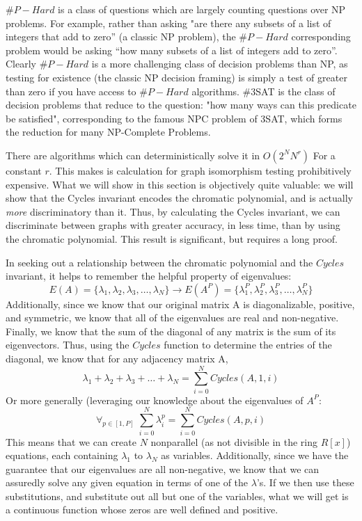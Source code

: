 $\#P-Hard$ is a class of questions which are largely counting questions over NP problems.
For example, rather than asking "are there any subsets of a list of integers that add to zero'' (a classic NP problem),
the $\#P-Hard$ corresponding problem would be asking ``how many subsets of a list of integers add to zero''.
Clearly $\#P-Hard$ is a more challenging class of decision problems than NP, as testing for existence (the classic NP decision framing) is simply a test of greater than zero if you have access to $\#P-Hard$ algorithms.
\#3SAT is the class of decision problems that reduce to the question: "how many ways can this predicate be satisfied", corresponding to the famous NPC problem of 3SAT, which forms the reduction for many NP-Complete Problems.

There are algorithms which can deterministically solve it in $O(2^N N^r)$ For a constant $r$.
This makes is calculation for graph isomorphism testing prohibitively expensive.
What we will show in this section is objectively quite valuable: we will show that the Cycles invariant encodes the chromatic polynomial, and is actually \emph{more} discriminatory than it.
Thus, by calculating the Cycles invariant, we can discriminate between graphs with greater accuracy, in less time, than by using the chromatic polynomial. 
This result is significant, but requires a long proof.

In seeking out a relationship between the chromatic polynomial and the $Cycles$ invariant, it helps to remember the helpful property of  eigenvalues:
$$E(A) = \{\lambda_1,\lambda_2,\lambda_3, \dots, \lambda_N\} \rightarrow E(A^P) = \{\lambda_1^P,\lambda_2^P,\lambda_3^P, \dots, \lambda_N^P\} $$
Additionally, since we know that our original matrix A is diagonalizable, positive, and symmetric, we know that all of the eigenvalues are real and non-negative. 
Finally, we know that the sum of the diagonal of any matrix is the sum of its eigenvectors. 
Thus, using the $Cycles$ function to determine the entries of the diagonal, we know that for any adjacency matrix A,
$$\lambda_1 + \lambda_2 + \lambda_3 + \dots + \lambda_N = \sum_{i = 0}^{N}{Cycles(A, 1, i)}$$
Or more generally (leveraging our knowledge about the eigenvalues of $A^P$:
$$ \forall_{p \in [1, P]} \; \sum_{i = 0}^N{\lambda_i^p} =  \sum_{i = 0}^{N}{Cycles(A, p, i)}$$
This means that we can create $N$ nonparallel (as not divisible in the ring $R[x]$) equations, each containing $\lambda_1$ to $\lambda_N$ as variables.
Additionally, since we have the guarantee that our eigenvalues are all non-negative, we know that we can assuredly solve any given equation in terms of one of the $\lambda$'s.
If we then use these substitutions, and substitute out all but one of the variables, what we will get is a continuous function whose zeros are well defined and positive. 

